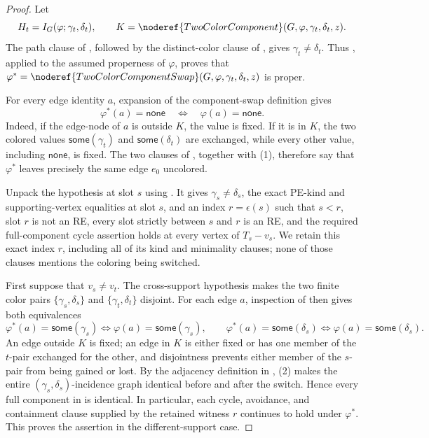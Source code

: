 \begin{proof}
Let
\[
 H_t=I_G(\varphi;\gamma_t,\delta_t),\qquad
 K=\noderef{TwoColorComponent}(G,\varphi,
       \gamma_t,\delta_t,z).
\]
The path clause of , followed by
the distinct-color clause of , gives
\(\gamma_t\ne\delta_t\).  Thus
, applied to the assumed properness
of \(\varphi\), proves that
\(\varphi^*=\noderef{TwoColorComponentSwap}(
G,\varphi,\gamma_t,\delta_t,z)\) is proper.

For every edge identity \(a\), expansion of the component-swap definition
gives
\[
                 \varphi^*(a)=\mathsf{none}
       \quad\Longleftrightarrow\quad
                 \varphi(a)=\mathsf{none}.                    \tag{1}
\]
Indeed, if the edge-node of \(a\) is outside \(K\), the value is fixed.
If it is in \(K\), the two colored values
\(\mathsf{some}(\gamma_t)\) and
\(\mathsf{some}(\delta_t)\) are exchanged, while every other value,
including \(\mathsf{none}\), is fixed.  The two clauses of
, together with (1), therefore say that
\(\varphi^*\) leaves precisely the same edge \(e_0\) uncolored.

Unpack the hypothesis at slot \(s\) using
.  It gives
\(\gamma_s\ne\delta_s\), the exact PE-kind and supporting-vertex
equalities at slot \(s\), and an index \(r=\epsilon(s)\) such that
\(s<r\), slot \(r\) is not an RE, every slot strictly between \(s\) and
\(r\) is an RE, and the required full-component cycle assertion holds at
every vertex of \(T_s-v_s\).  We retain this exact index \(r\), including
all of its kind and minimality clauses; none of those clauses mentions the
coloring being switched.

First suppose that \(v_s\ne v_t\).  The cross-support hypothesis makes
the two finite color pairs
\(\{\gamma_s,\delta_s\}\) and
\(\{\gamma_t,\delta_t\}\) disjoint.  For each edge \(a\), inspection of
 then gives both equivalences
\[
 \varphi^*(a)=\mathsf{some}(\gamma_s)
   \Longleftrightarrow
 \varphi(a)=\mathsf{some}(\gamma_s),\qquad
 \varphi^*(a)=\mathsf{some}(\delta_s)
   \Longleftrightarrow
 \varphi(a)=\mathsf{some}(\delta_s).                           \tag{2}
\]
An edge outside \(K\) is fixed; an edge in \(K\) is either fixed or has
one member of the \(t\)-pair exchanged for the other, and disjointness
prevents either member of the \(s\)-pair from being gained or lost.
By the adjacency definition in , (2)
makes the entire \((\gamma_s,\delta_s)\)-incidence graph identical before
and after the switch.  Hence every full component in
 is identical.  In particular, each cycle,
avoidance, and containment clause supplied by the retained witness \(r\)
continues to hold under \(\varphi^*\).  This proves the assertion in the
different-support case.


\end{proof}

